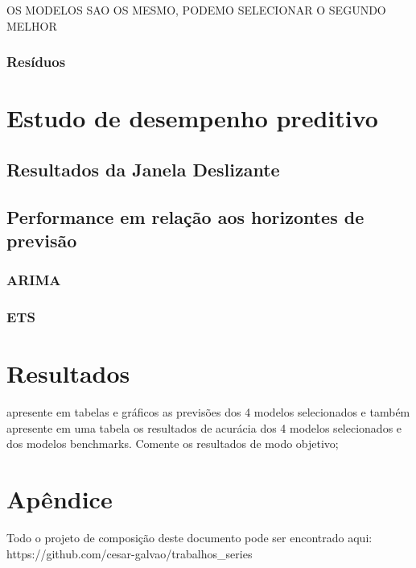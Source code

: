 \documentclass[
  letterpaper,
  DIV=11,
  numbers=noendperiod]{scrartcl}
\begin{document}
OS MODELOS SAO OS MESMO, PODEMO SELECIONAR O SEGUNDO MELHOR

\hypertarget{resuxedduos-3}{%
\subsubsection{Resíduos}\label{resuxedduos-3}}

\hypertarget{estudo-de-desempenho-preditivo}{%
\section{Estudo de desempenho
preditivo}\label{estudo-de-desempenho-preditivo}}

\hypertarget{resultados-da-janela-deslizante}{%
\subsection{Resultados da Janela
Deslizante}\label{resultados-da-janela-deslizante}}

\hypertarget{performance-em-relauxe7uxe3o-aos-horizontes-de-previsuxe3o}{%
\subsection{Performance em relação aos horizontes de
previsão}\label{performance-em-relauxe7uxe3o-aos-horizontes-de-previsuxe3o}}

\hypertarget{arima}{%
\subsubsection{ARIMA}\label{arima}}

\hypertarget{ets}{%
\subsubsection{ETS}\label{ets}}

\hypertarget{resultados}{%
\section{Resultados}\label{resultados}}

apresente em tabelas e gráficos as previsões dos 4 modelos selecionados
e também apresente em uma tabela os resultados de acurácia dos 4 modelos
selecionados e dos modelos benchmarks. Comente os resultados de modo
objetivo;

\hypertarget{apuxeandice}{%
\section{Apêndice}\label{apuxeandice}}

Todo o projeto de composição deste documento pode ser encontrado aqui:
https://github.com/cesar-galvao/trabalhos\_series
\end{document}
